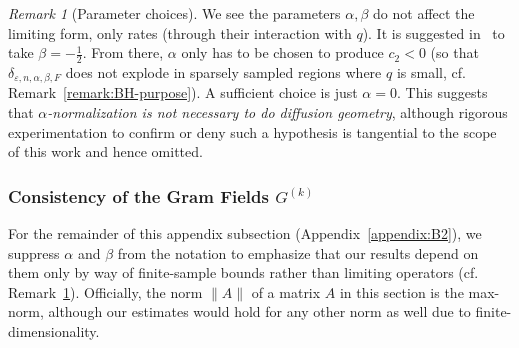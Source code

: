 \documentclass{article}
\let\todo\undefined
\let\todo\undefined
\newcommand{\todo}[1][]{}
\theoremstyle{remark}
\newtheorem{remark}{Remark}
\theoremstyle{plain}
\begin{document}
\begin{remark}[Parameter choices]
We see the parameters \( \alpha, \beta \) do not affect the limiting form, only rates (through their interaction with \( q \)). It is suggested in~\cite{Berry2016} to take \( \beta=-\frac{1}{2} \). From there, \( \alpha \) only has to be chosen to produce \( c_{2}<0 \) (so that \( \delta_{\varepsilon, n ,\alpha, \beta, F} \) does not explode in sparsely sampled regions where \( q \) is small, cf. Remark~\ref{remark:BH-purpose}). A sufficient choice is just \( \alpha=0 \). This suggests that \textit{\( \alpha \)-normalization is not necessary to do diffusion geometry}, although rigorous experimentation to confirm or deny such a hypothesis is tangential to the scope of this work and hence omitted. 
    \label{rmk:parameter-choices}
\end{remark}

\subsubsection{Consistency of the Gram Fields \( G^{(k)} \)}
\label{subsubsec:tangential-projector-consistency}


For the remainder of this appendix subsection (Appendix~\ref{appendix:B2}), we suppress \( \alpha \) and \( \beta \) from the notation to emphasize that our results depend on them only by way of finite-sample bounds rather than limiting operators (cf. Remark~\ref{rmk:parameter-choices}). Officially, the norm \( \|A\| \) of a matrix \( A \) in this section is the max-norm, although our estimates would hold for any other norm as well due to finite-dimensionality. 
\end{document}
